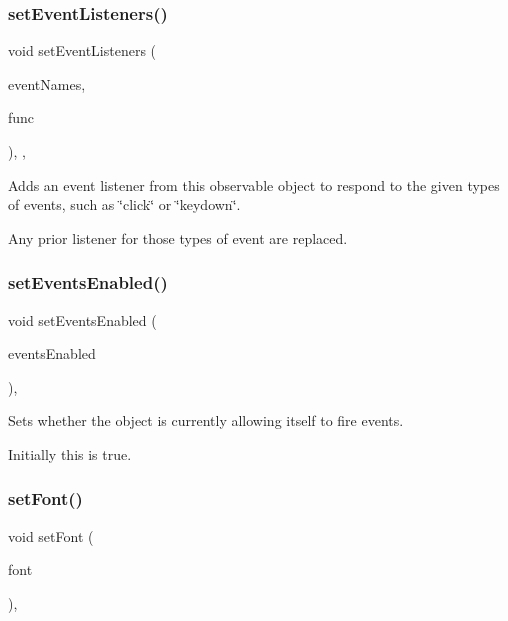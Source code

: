 \subsubsection{\texorpdfstring{set\+Event\+Listeners()}{setEventListeners()}\hspace{0.1cm}{\footnotesize\ttfamily [2/2]}}
{\footnotesize\ttfamily void set\+Event\+Listeners (\begin{DoxyParamCaption}\item[{std\+::initializer\+\_\+list$<$ std\+::string $>$}]{event\+Names,  }\item[{G\+Event\+Listener\+Void}]{func }\end{DoxyParamCaption})\hspace{0.3cm}{\ttfamily [protected]}, {\ttfamily [virtual]}, {\ttfamily [inherited]}}



Adds an event listener from this observable object to respond to the given types of events, such as \char`\"{}click\char`\"{} or \char`\"{}keydown\char`\"{}. 

Any prior listener for those types of event are replaced. \mbox{\label{classGObservable_afaa30b2a9e0f378fd1c70d2f1d0b8216}} 
\subsubsection{\texorpdfstring{set\+Events\+Enabled()}{setEventsEnabled()}}
{\footnotesize\ttfamily void set\+Events\+Enabled (\begin{DoxyParamCaption}\item[{bool}]{events\+Enabled }\end{DoxyParamCaption})\hspace{0.3cm}{\ttfamily [virtual]}, {\ttfamily [inherited]}}



Sets whether the object is currently allowing itself to fire events. 

Initially this is true. \mbox{\label{classGInteractor_a2592348886ffea646c6534bf88f7c49d}} 
\subsubsection{\texorpdfstring{set\+Font()}{setFont()}\hspace{0.1cm}{\footnotesize\ttfamily [1/2]}}
{\footnotesize\ttfamily void set\+Font (\begin{DoxyParamCaption}\item[{const Q\+Font \&}]{font }\end{DoxyParamCaption})\hspace{0.3cm}{\ttfamily [virtual]}, {\ttfamily [inherited]}}



